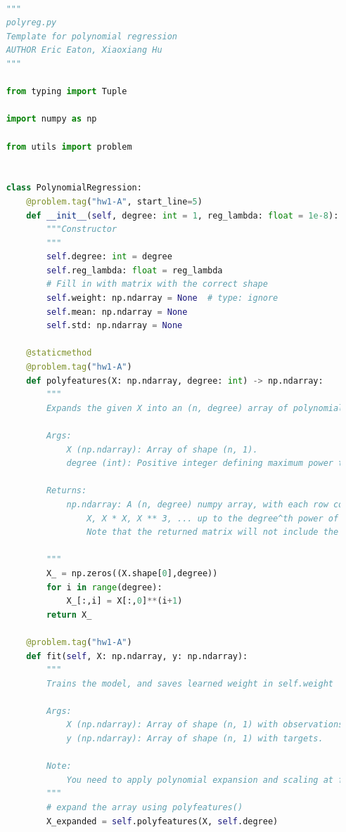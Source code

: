 \documentclass{article}
\begin{document}
\begin{lstlisting}[language=Python]

    """
    polyreg.py
    Template for polynomial regression
    AUTHOR Eric Eaton, Xiaoxiang Hu
    """

    from typing import Tuple

    import numpy as np

    from utils import problem


    class PolynomialRegression:
        @problem.tag("hw1-A", start_line=5)
        def __init__(self, degree: int = 1, reg_lambda: float = 1e-8):
            """Constructor
            """
            self.degree: int = degree
            self.reg_lambda: float = reg_lambda
            # Fill in with matrix with the correct shape
            self.weight: np.ndarray = None  # type: ignore
            self.mean: np.ndarray = None
            self.std: np.ndarray = None

        @staticmethod
        @problem.tag("hw1-A")
        def polyfeatures(X: np.ndarray, degree: int) -> np.ndarray:
            """
            Expands the given X into an (n, degree) array of polynomial features of degree degree.

            Args:
                X (np.ndarray): Array of shape (n, 1).
                degree (int): Positive integer defining maximum power to include.

            Returns:
                np.ndarray: A (n, degree) numpy array, with each row comprising of
                    X, X * X, X ** 3, ... up to the degree^th power of X.
                    Note that the returned matrix will not include the zero-th power.

            """
            X_ = np.zeros((X.shape[0],degree))
            for i in range(degree):
                X_[:,i] = X[:,0]**(i+1)
            return X_

        @problem.tag("hw1-A")
        def fit(self, X: np.ndarray, y: np.ndarray):
            """
            Trains the model, and saves learned weight in self.weight

            Args:
                X (np.ndarray): Array of shape (n, 1) with observations.
                y (np.ndarray): Array of shape (n, 1) with targets.

            Note:
                You need to apply polynomial expansion and scaling at first.
            """
            # expand the array using polyfeatures()
            X_expanded = self.polyfeatures(X, self.degree)


\end{lstlisting}
\end{document}
